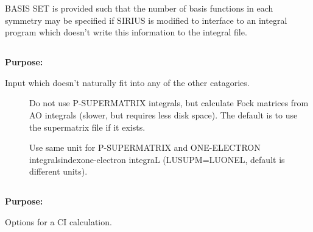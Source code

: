  
BASIS SET is provided such that the number of basis functions in each
symmetry may be specified if SIRIUS is modified to interface to an
integral program which doesn't write this information to the integral
file.
 
 
 
\pagebreak[3]
\subsection{\label{ref-auxinp}}
 
{\bf Purpose:}
 
Input which doesn't naturally fit into any of the other catagories.
 
\begin{description}
\item[]
  Do not use P-SUPERMATRIX integrals, but calculate Fock matrices
  from AO integrals (slower, but requires less disk space). The
  default is to use the supermatrix file if it exists.

\item[]
  Use same unit for P-SUPERMATRIX and ONE-ELECTRON
  integralsindex{one-electron integraL}
  (LUSUPM=LUONEL, default is different units).
\end{description}

\pagebreak[3]
\subsection{\label{ref-cicinp}}
 
{\bf Purpose:}
 
Options for a CI calculation.
 
